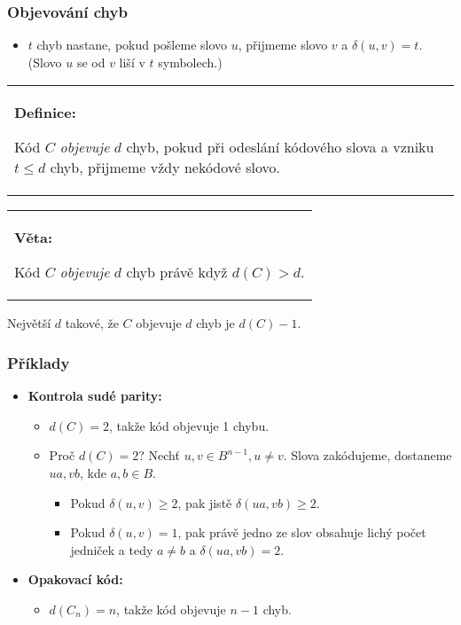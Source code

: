 \documentclass{beamer}
\newenvironment{definice}
{
    \begin{center}
    \begin{tabular}{p{9cm}}
    \textbf{Definice:}
}
{
    \end{tabular}
    \end{center}
}
\newenvironment{veta}
{
    \begin{center}
    \begin{tabular}{p{9cm}}
    \textbf{Věta:}
}
{
    \end{tabular}
    \end{center}
}
\newenvironment{itemizex}%
  {\large \begin{itemize}%
    \setlength{\itemsep}{8pt}%
    \setlength{\parskip}{8pt}}%
  {\end{itemize}}
\begin{document}
\begin{frame}[t,fragile]\frametitle{Objevování chyb} 
    \begin{itemizex}
        \item $t$ chyb nastane, pokud pošleme slovo $u$, přijmeme slovo $v$ a $\delta(u,v)=t$. (Slovo $u$ se od $v$ liší v $t$ symbolech.)
    \end{itemizex}

\begin{definice}
Kód $C$ \textit{objevuje} $d$ chyb, pokud při odeslání kódového slova a vzniku $t\le d$ chyb, přijmeme vždy nekódové slovo.
\end{definice}

\begin{veta}
Kód $C$ \textit{objevuje} $d$ chyb právě když $d(C)>d$.
\end{veta}

Největší $d$ takové, že $C$ objevuje $d$ chyb je $d(C)-1$.
\end{frame}


\begin{frame}[t,fragile]\frametitle{Příklady} 
    \begin{itemizex}
        \item \textbf{Kontrola sudé parity:}
        \begin{itemize}
            \item $d(C)=2$, takže kód objevuje 1 chybu.
            \item Proč $d(C)=2$? Nechť $u,v\in B^{n-1}, u\ne v$. Slova zakódujeme, dostaneme $ua, vb$, kde $a, b\in B$. 
            \begin{itemize}
                \item Pokud $\delta(u,v)\ge2$, pak jistě $\delta(ua, vb)\ge2$.
                \item Pokud $\delta(u,v)=1$, pak právě jedno ze slov obsahuje lichý počet jedniček a tedy $a\ne b$ a $\delta(ua, vb)=2$. 
            \end{itemize}
        \end{itemize}
        \item \textbf{Opakovací kód:}
            \begin{itemize}
                \item $d(C_n)=n$, takže kód objevuje $n-1$ chyb.
            \end{itemize}
    \end{itemizex}
\end{frame}
\end{document}
